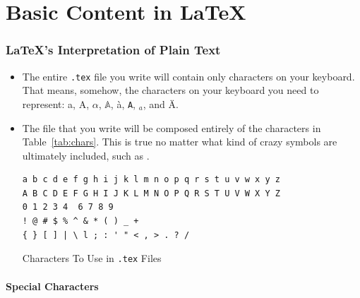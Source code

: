 \part{Basic Content in LaTeX{}}

\section{\LaTeX{}'s Interpretation of Plain Text}

\begin{itemize}
\item The entire \texttt{.tex} file you write will contain only characters on
  your keyboard. That means, somehow, the characters on your keyboard you need
  to represent: a, A, $\alpha$, $\mathbb{A}$, \`a, \texttt{A}, $_a$, and \"A.

\item The file that you write will be composed entirely of the characters in
  Table~\ref{tab:chars}. This is true no matter what kind of crazy symbols are
  ultimately included, such as \staveVI.

  \begin{table}[h]
    \centering
    \begin{center}
      \begin{minipage}{.85\textwidth}
        \begin{framed}
\begin{verbatim}
a b c d e f g h i j k l m n o p q r s t u v w x y z
A B C D E F G H I J K L M N O P Q R S T U V W X Y Z
0 1 2 3 4  6 7 8 9
! @ # $ % ^ & * ( ) _ +
{ } [ ] | \ l ; : ' " < , > . ? /
\end{verbatim}
        \end{framed}
      \end{minipage}
    \end{center}
    \caption{Characters To Use in \texttt{.tex} Files} \label{tab:chars}
  \end{table}
\end{itemize}

\subsection*{Special Characters}

